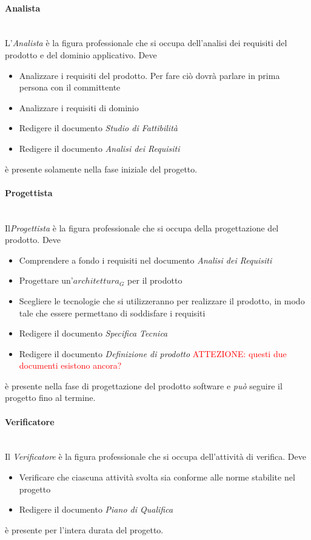 		\paragraph{Analista} \mbox{} \\
		L'\emph{Analista} è la figura professionale che si occupa dell'analisi dei requisiti del prodotto e del dominio applicativo. Deve
		\begin{itemize}
			\item Analizzare i requisiti del prodotto. Per fare ciò dovrà parlare in prima persona con il committente
			\item Analizzare i requisiti di dominio
			\item Redigere il documento \emph{Studio di Fattibilità}
			\item Redigere il documento \emph{Analisi dei Requisiti}
		\end{itemize}
		è presente solamente nella fase iniziale del progetto.
		\paragraph{Progettista} \mbox{} \\
		Il\emph{Progettista} è la figura professionale che si occupa della progettazione del prodotto. Deve
		\begin{itemize}
			\item Comprendere a fondo i requisiti nel documento \emph{Analisi dei Requisiti}
			\item Progettare un'$architettura_G$ per il prodotto
			\item Scegliere le tecnologie che si utilizzeranno per realizzare il prodotto, in modo tale che essere permettano di soddisfare i requisiti
			\item Redigere il documento \emph{Specifica Tecnica}
			\item Redigere il documento \emph{Definizione di prodotto} \textcolor{red}{ATTEZIONE: questi due documenti esistono ancora?}
		\end{itemize}
		è presente nella fase di progettazione del prodotto software e \emph{può} seguire il progetto fino al termine.
		\paragraph{Verificatore} \mbox{} \\
		Il \emph{Verificatore} è la figura professionale che si occupa dell'attività di verifica. Deve
		\begin{itemize}
			\item Verificare che ciascuna attività svolta sia conforme alle norme stabilite nel progetto
			\item Redigere il documento \emph{Piano di Qualifica}
		\end{itemize}
		è presente per l'intera durata del progetto.
